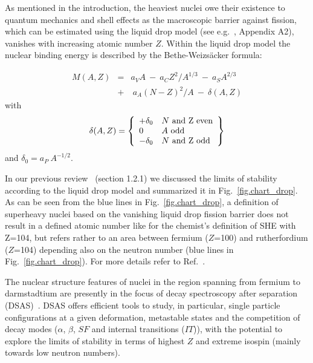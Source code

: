 As mentioned in the introduction, the heaviest nuclei owe their existence to quantum mechanics and shell effects as the macroscopic barrier against fission, which can be estimated using the liquid drop model (see e.g.~\cite{Bohr1975}, Appendix A2), vanishes with increasing atomic number $Z$.
Within the liquid drop model the nuclear binding energy is described by the Bethe-Weizs\"{a}cker formula:


\begin{eqnarray}
M(A,Z)  &= &a_V A \ - \ a_C Z^2/A^{1/3} \ - \ a_S A^{2/3} \nonumber  \\ 
                &+& \ a_A (N-Z)^2/A \ - \ \delta(A,Z)
\end{eqnarray}
with
\begin{equation}
\delta(A,Z) =
   \left \{
   \begin{array}{l l}
      +\delta_0  & N \ \rm{and} \ Z \ \rm{even} \\
      0 & A \ \rm{odd} \\
      -\delta_0 & N \ \rm{and} \ Z \ \rm{odd}
   \end{array}
   \right \}
\end{equation}
and $\delta_0 = a_P \ A^{-1/2}$.


In our previous review~\cite{Ackermann2017} (section 1.2.1) we discussed the limits of stability according to the liquid drop model and summarized it in Fig.~\ref{fig.chart_drop}.
As can be seen from the blue lines in Fig.~\ref{fig.chart_drop}, a definition of superheavy nuclei based on the vanishing liquid drop fission barrier does not result in a defined atomic number like for the chemist's definition of SHE with Z=104, but refers rather to an area between fermium ($Z$=100) and rutherfordium ($Z$=104) depending also on the neutron number (blue lines in Fig.~\ref{fig.chart_drop}). For more details refer to Ref.~\cite{Ackermann2017}.

The nuclear structure features of nuclei in the region spanning from fermium to darmstadtium are presently in the focus of decay spectroscopy after separation (DSAS)~\cite {Ackermann2017,Ackermann2024,Asai2015}. DSAS offers efficient tools to study, in particular, single particle configurations at a given deformation, metastable states and the competition of decay modes ($\alpha$, $\beta$, $SF$ and internal transitions ($IT$)), with the potential to explore the limits of stability in terms of highest $Z$ and extreme isospin (mainly towards low neutron numbers).  


